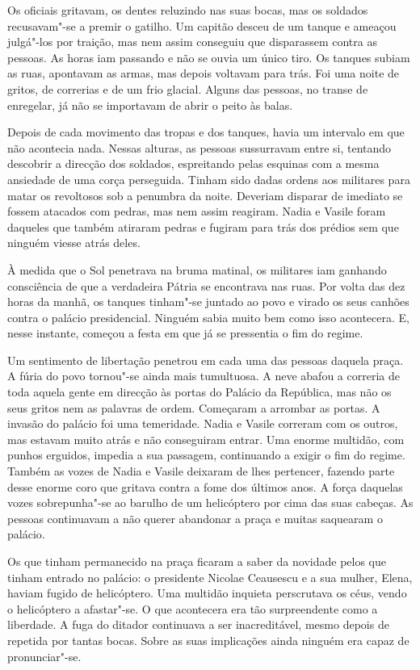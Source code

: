 Os oficiais gritavam, os dentes reluzindo nas suas bocas, mas os
soldados recusavam"-se a premir o gatilho. Um capitão desceu de um tanque
e ameaçou julgá"-los por traição, mas nem assim conseguiu que disparassem
contra as pessoas. As horas iam passando e não se ouvia um único tiro.
Os tanques subiam as ruas, apontavam as armas, mas depois voltavam para
trás. Foi uma noite de gritos, de correrias e de um frio glacial. Alguns
das pessoas, no transe de enregelar, já não se importavam de abrir o
peito às balas.

Depois de cada movimento das tropas e dos tanques, havia um intervalo em
que não acontecia nada. Nessas alturas, as pessoas sussurravam entre si,
tentando descobrir a direcção dos soldados, espreitando pelas esquinas
com a mesma ansiedade de uma corça perseguida. Tinham sido dadas ordens
aos militares para matar os revoltosos sob a penumbra da noite. Deveriam
disparar de imediato
se fossem atacados com pedras, mas nem assim reagiram. Nadia e Vasile
foram daqueles que também atiraram pedras e fugiram para trás dos
prédios sem que ninguém viesse atrás deles.

À medida que o Sol penetrava na bruma matinal, os militares iam ganhando
consciência de que a verdadeira Pátria se encontrava nas ruas. Por volta
das dez horas da manhã, os tanques tinham"-se juntado ao povo e virado os
seus canhões contra o palácio presidencial. Ninguém sabia muito bem como
isso acontecera. E, nesse instante, começou a festa em que já se
pressentia o fim do regime.

Um sentimento de libertação penetrou em cada uma das pessoas daquela
praça. A fúria do povo tornou"-se ainda mais tumultuosa. A neve abafou a
correria de toda aquela gente em direcção às portas do Palácio da
República, mas não os seus gritos nem as palavras de ordem. Começaram a
arrombar as portas. A invasão do palácio foi uma temeridade. Nadia e
Vasile correram com os outros, mas estavam muito atrás e não
conseguiram entrar. Uma enorme multidão, com punhos erguidos, impedia a
sua passagem, continuando a exigir o fim do regime. Também as vozes de
Nadia e Vasile deixaram de lhes pertencer, fazendo parte desse enorme
coro que gritava contra a fome dos últimos anos. A força daquelas vozes
sobrepunha"-se ao barulho de um helicóptero por cima das suas cabeças. As
pessoas continuavam a não querer abandonar a praça e muitas saquearam o
palácio.

Os que tinham permanecido na praça ficaram a saber da novidade pelos que
tinham entrado no palácio: o presidente Nicolae Ceausescu e a sua mulher, Elena, haviam fugido de
helicóptero. Uma multidão inquieta perscrutava os céus, vendo o
helicóptero a afastar"-se. O que acontecera era tão surpreendente como a
liberdade. A fuga do ditador continuava a ser inacreditável, mesmo
depois de repetida por tantas bocas. Sobre as suas implicações ainda
ninguém era capaz de pronunciar"-se.

